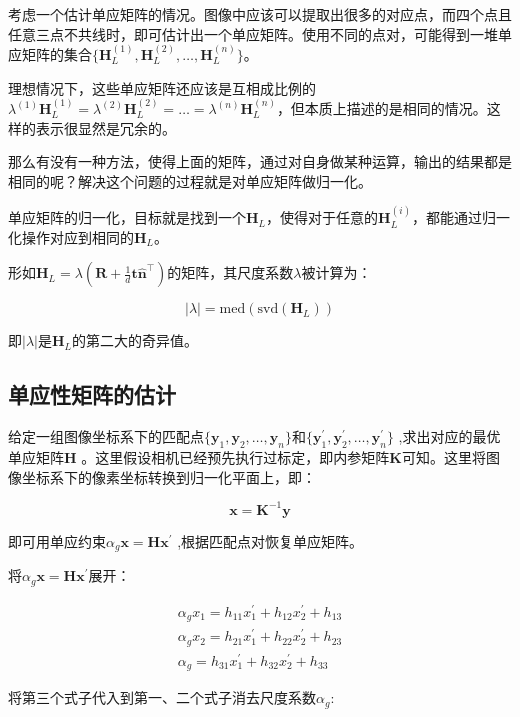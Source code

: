 \documentclass{article}
\begin{document}
考虑一个估计单应矩阵的情况。图像中应该可以提取出很多的对应点，而四个点且任意三点不共线时，即可估计出一个单应矩阵。使用不同的点对，可能得到一堆单应矩阵的集合$\{\mathbf{H}_{L}^{(1)},\mathbf{H}_{L}^{(2)},\ldots,\mathbf{H}_{L}^{(n)}\}$。

理想情况下，这些单应矩阵还应该是互相成比例的$\lambda^{(1)}\mathbf{H}_{L}^{(1)}=\lambda^{(2)}\mathbf{H}_{L}^{(2)}=\ldots=\lambda^{(n)}\mathbf{H}_{L}^{(n)}$，但本质上描述的是相同的情况。这样的表示很显然是冗余的。

那么有没有一种方法，使得上面的矩阵，通过对自身做某种运算，输出的结果都是相同的呢？解决这个问题的过程就是对单应矩阵做归一化。

单应矩阵的归一化，目标就是找到一个$\mathbf{H}_{L}$，使得对于任意的$\mathbf{H}_{L}^{(i)}$，都能通过归一化操作对应到相同的$\mathbf{H}_{L}$。


形如$\mathbf{H}_{L}=\lambda(\mathbf{R}+\frac{1}{d}\mathbf{t}\hat{\mathbf{n}}^{\top})$的矩阵，其尺度系数$\lambda$被计算为：

$$|\lambda|=\text{med}(\text{svd}(\mathbf{H}_{L}))$$


即$|\lambda|$是$\mathbf{H}_{L}$的第二大的奇异值\cite{ma2004invitation}。

\subsection{单应性矩阵的估计}
给定一组图像坐标系下的匹配点$\{\mathbf{y}_1,\mathbf{y}_2,\ldots,\mathbf{y}_n\}$和$\{\mathbf{y}_1^{\prime},\mathbf{y}_2^{\prime},\ldots,\mathbf{y}_n^{\prime}\}$ ,求出对应的最优单应矩阵$\mathbf{H}$ 。这里假设相机已经预先执行过标定，即内参矩阵$\mathbf{K}$可知。这里将图像坐标系下的像素坐标转换到归一化平面上，即：

$$\mathbf{x}=\mathbf{K}^{-1}\mathbf{y}$$

即可用单应约束$\alpha_g\mathbf{x}=\mathbf{H}\mathbf{x}^{\prime}$ ,根据匹配点对恢复单应矩阵。

将$\alpha_g\mathbf{x}=\mathbf{H}\mathbf{x}^{\prime}$展开：

$$\begin{gathered}\alpha_{g}x_{1}=h_{11}x_1^{\prime}+h_{12}x_2^{\prime}+h_{13}\\\alpha_gx_2=h_{21}x_1^{\prime}+h_{22}x_2^{\prime}+h_{23}\\\alpha_{g}=h_{31}x_1^{\prime}+h_{32}x_2^{\prime}+h_{33}\end{gathered}$$

将第三个式子代入到第一、二个式子消去尺度系数$\alpha_g:$
\end{document}
